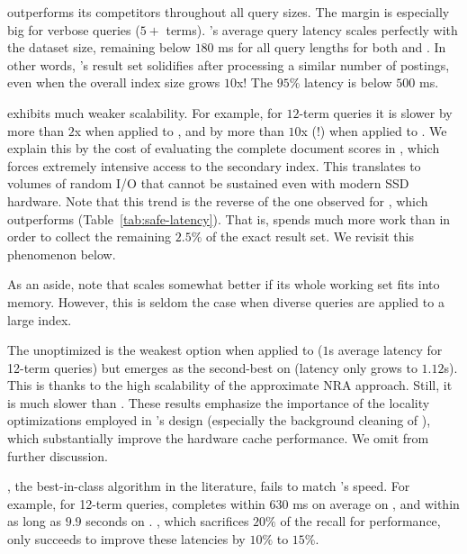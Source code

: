 \alg\/ outperforms its competitors throughout all query sizes. The margin is especially big for verbose queries
($5+$ terms). \alg's average query latency scales perfectly with the dataset size, 
remaining below $180$ ms for all query lengths for both \cw\/ and \cwten. In other words, \alg's result set solidifies after processing 
a similar number of postings, even when the overall index size grows $10$x!  The $95\%$ latency is below $500$ ms. 

\pRA\/ exhibits much weaker scalability. For example, for $12$-term queries it is slower by more than $2$x 
when applied to \cw, and by more than $10$x (!) when applied to \cwten. We explain this by the cost of evaluating the complete 
document scores in \pRA, which forces extremely intensive access to the secondary index. This translates to volumes of random 
I/O that cannot be sustained even with modern SSD hardware. Note that this trend is the reverse of the one observed for \pRA\ex, 
which outperforms \alg\ex\/ (Table~\ref{tab:safe-latency}). That is, \alg\/ spends much more work than \pRA\/ 
in order to collect the remaining $2.5\%$ of the exact result set. We revisit this phenomenon  below. 

As an aside, note that \pRA\/ scales somewhat better if its whole working set fits into memory. 
However, this is seldom the case when diverse queries are applied to a large index.

The unoptimized \pNRA\/ is the weakest option when applied to \cw\/ ($1$s average latency for 12-term queries)
but emerges as the second-best on \cwten\/ (latency only grows to $1.12$s). This is thanks to the high scalability 
of the approximate NRA approach.
Still, it is much slower than
\alg. These results emphasize the importance of the locality optimizations employed in \alg's design (especially the background 
cleaning of \DMap), which substantially improve the hardware cache performance. We omit \pNRA\/ from 
further discussion. 

\pBMW, the best-in-class algorithm in the literature, fails to match \alg's speed. For example, for 12-term queries, 
\pBMW\hi\/ completes  within $630$ ms on average on \cw, and within as long as $9.9$ seconds on \cwten. \pBMW\lo, 
which sacrifices $20\%$ of the recall for performance, only succeeds to improve these latencies by $10\%$ to $15\%$. 

